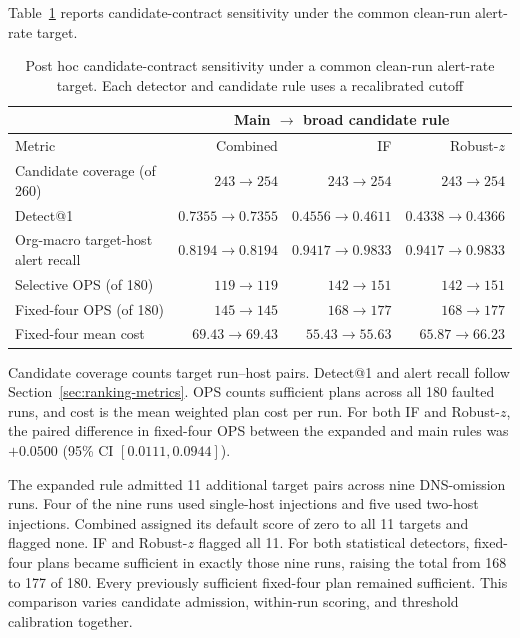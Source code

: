 \documentclass[sn-basic]{sn-jnl}%
\theoremstyle{thmstyleone}%
\theoremstyle{thmstyletwo}%
\theoremstyle{thmstylethree}%
\begin{document}
Table~\ref{tab:candidate-contract} reports candidate-contract sensitivity under the common clean-run alert-rate target.

\begin{table}[htbp]
\centering
\caption{Post hoc candidate-contract sensitivity under a common clean-run alert-rate target. Each detector and candidate rule uses a recalibrated cutoff}
\label{tab:candidate-contract}
\small
\setlength{\tabcolsep}{3pt}
\renewcommand{\arraystretch}{1.12}
\begin{tabularx}{\linewidth}{@{}>{\raggedright\arraybackslash}Xrrr@{}}
\toprule
& \multicolumn{3}{c}{Main \(\to\) broad candidate rule} \\
\cmidrule(l){2-4}
Metric & Combined & IF & Robust-\(z\) \\
\midrule
Candidate coverage (of 260) & \(243 \to 254\) & \(243 \to 254\) & \(243 \to 254\) \\
Detect@1 & \(0.7355 \to 0.7355\) & \(0.4556 \to 0.4611\) & \(0.4338 \to 0.4366\) \\
Org-macro target-host alert recall & \(0.8194 \to 0.8194\) & \(0.9417 \to 0.9833\) & \(0.9417 \to 0.9833\) \\
Selective OPS (of 180) & \(119 \to 119\) & \(142 \to 151\) & \(142 \to 151\) \\
Fixed-four OPS (of 180) & \(145 \to 145\) & \(168 \to 177\) & \(168 \to 177\) \\
Fixed-four mean cost & \(69.43 \to 69.43\) & \(55.43 \to 55.63\) & \(65.87 \to 66.23\) \\
\bottomrule
\end{tabularx}
\end{table}

Candidate coverage counts target run--host pairs. Detect@1 and alert recall follow Section~\ref{sec:ranking-metrics}. OPS counts sufficient plans across all 180 faulted runs, and cost is the mean weighted plan cost per run. For both IF and Robust-\(z\), the paired difference in fixed-four OPS between the expanded and main rules was \(+0.0500\) (95\% CI \([0.0111, 0.0944]\)).

The expanded rule admitted 11 additional target pairs across nine DNS-omission runs. Four of the nine runs used single-host injections and five used two-host injections. Combined assigned its default score of zero to all 11 targets and flagged none. IF and Robust-\(z\) flagged all 11. For both statistical detectors, fixed-four plans became sufficient in exactly those nine runs, raising the total from 168 to 177 of 180. Every previously sufficient fixed-four plan remained sufficient. This comparison varies candidate admission, within-run scoring, and threshold calibration together.
\end{document}
